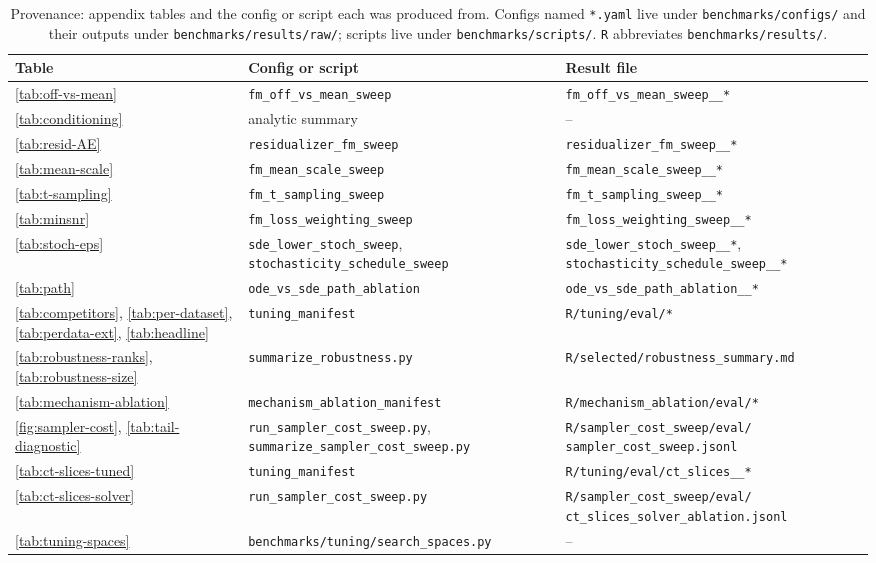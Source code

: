 \documentclass{article}
\begin{document}
\begin{table}[t]
  \centering
  \caption{Provenance: appendix tables and the config or script each was produced from. Configs named \texttt{*.yaml} live under \texttt{benchmarks/configs/} and their outputs under \texttt{benchmarks/results/raw/}; scripts live under \texttt{benchmarks/scripts/}. \texttt{R} abbreviates \texttt{benchmarks/results/}.}\label{tab:appendix-provenance}
  \footnotesize
  \setlength{\tabcolsep}{4pt}
  \begin{tabular}{@{}>{\raggedright\arraybackslash}p{}>{\raggedright\arraybackslash}p{}>{\raggedright\arraybackslash}p{}@{}}
    \toprule
    Table & Config or script & Result file \\
    \midrule
    \ref{tab:off-vs-mean}   & \texttt{fm\_off\_vs\_mean\_sweep}   & \texttt{fm\_off\_vs\_mean\_sweep\_\_*} \\
    \ref{tab:conditioning}  & analytic summary & -- \\
    \ref{tab:resid-AE}      & \texttt{residualizer\_fm\_sweep}    & \texttt{residualizer\_fm\_sweep\_\_*} \\
    \ref{tab:mean-scale}    & \texttt{fm\_mean\_scale\_sweep}     & \texttt{fm\_mean\_scale\_sweep\_\_*} \\
    \ref{tab:t-sampling}    & \texttt{fm\_t\_sampling\_sweep}     & \texttt{fm\_t\_sampling\_sweep\_\_*} \\
    \ref{tab:minsnr}        & \texttt{fm\_loss\_weighting\_sweep} & \texttt{fm\_loss\_weighting\_sweep\_\_*} \\
    \ref{tab:stoch-eps}     & \texttt{sde\_lower\_stoch\_sweep}, \texttt{stochasticity\_schedule\_sweep} & \texttt{sde\_lower\_stoch\_sweep\_\_*}, \texttt{stochasticity\_schedule\_sweep\_\_*} \\
    \ref{tab:path}          & \texttt{ode\_vs\_sde\_path\_ablation} & \texttt{ode\_vs\_sde\_path\_ablation\_\_*} \\
    \ref{tab:competitors}, \ref{tab:per-dataset}, \ref{tab:perdata-ext}, \ref{tab:headline} & \texttt{tuning\_manifest} & \texttt{R/tuning/eval/*} \\
    \ref{tab:robustness-ranks}, \ref{tab:robustness-size} & \texttt{summarize\_robustness.py} & \texttt{R/selected/robustness\_summary.md} \\
    \ref{tab:mechanism-ablation} & \texttt{mechanism\_ablation\_manifest} & \texttt{R/mechanism\_ablation/eval/*} \\
    \ref{fig:sampler-cost}, \ref{tab:tail-diagnostic} & \texttt{run\_sampler\_cost\_sweep.py}, \texttt{summarize\_sampler\_cost\_sweep.py} & \texttt{R/sampler\_cost\_sweep/eval/} \texttt{sampler\_cost\_sweep.jsonl} \\
    \ref{tab:ct-slices-tuned} & \texttt{tuning\_manifest} & \texttt{R/tuning/eval/ct\_slices\_\_*} \\
    \ref{tab:ct-slices-solver} & \texttt{run\_sampler\_cost\_sweep.py} & \texttt{R/sampler\_cost\_sweep/eval/} \texttt{ct\_slices\_solver\_ablation.jsonl} \\
    \ref{tab:tuning-spaces} & \texttt{benchmarks/tuning/search\_spaces.py} & -- \\
    \bottomrule
  \end{tabular}
\end{table}
\end{document}
